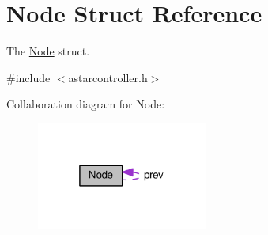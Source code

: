 \hypertarget{structNode}{}\section{Node Struct Reference}
\label{structNode}


The \hyperlink{structNode}{Node} struct.  




{\ttfamily \#include $<$astarcontroller.\+h$>$}



Collaboration diagram for Node\+:\nopagebreak
\begin{figure}[H]
\begin{center}
\leavevmode
\includegraphics[width=160pt]{d6/d2c/structNode__coll__graph}
\end{center}
\end{figure}
